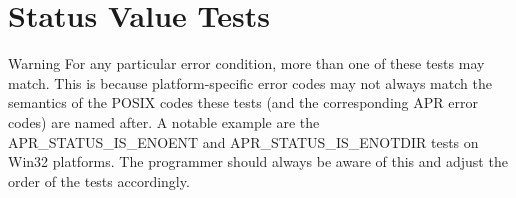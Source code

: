 \hypertarget{group___a_p_u___s_t_a_t_u_s___i_s}{\section{Status Value Tests}
\label{group___a_p_u___s_t_a_t_u_s___i_s}
}
\begin{DoxyWarning}{Warning}
For any particular error condition, more than one of these tests may match. This is because platform-\/specific error codes may not always match the semantics of the P\-O\-S\-I\-X codes these tests (and the corresponding A\-P\-R error codes) are named after. A notable example are the A\-P\-R\-\_\-\-S\-T\-A\-T\-U\-S\-\_\-\-I\-S\-\_\-\-E\-N\-O\-E\-N\-T and A\-P\-R\-\_\-\-S\-T\-A\-T\-U\-S\-\_\-\-I\-S\-\_\-\-E\-N\-O\-T\-D\-I\-R tests on Win32 platforms. The programmer should always be aware of this and adjust the order of the tests accordingly. 
\end{DoxyWarning}
